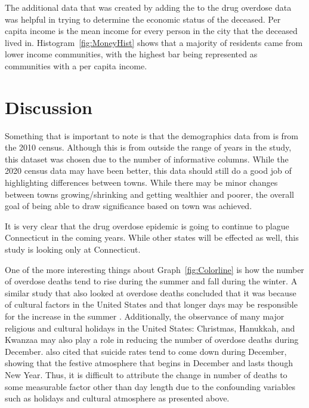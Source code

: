 \documentclass[12pt, letterpaper, titlepage]{article}
\begin{document}
The additional data that was created by adding the \citet{wikiwand_2023} to the drug overdose data was helpful in trying to determine the economic status of the deceased.  Per capita income is the mean income for every person in the city that the deceased lived in.  Histogram~\ref{fig:MoneyHist} shows that a majority of residents came from lower income communities, with the highest bar being represented as communities with a per capita income.  

\section{Discussion}\label{sec:Discussion}
Something that is important to note is that the demographics data from \citet{wikiwand2023} is from the 2010 census.  Although this is from outside the range of years in the study, this dataset was chosen due to the number of informative columns.  While the 2020 census data may have been better, this data should still do a good job of highlighting differences between towns.  While there may be minor changes between towns growing/shrinking and getting wealthier and poorer, the overall goal of being able to draw significance based on town was achieved.

It is very clear that the drug overdose epidemic is going to continue to plague Connecticut in the coming years.  While other states will be effected as well, this study is looking only at Connecticut.

One of the more interesting things about Graph~\ref{fig:Colorline} is how the number of overdose deaths tend to rise during the summer and fall during the winter.  A similar study that also looked at overdose deaths concluded that it was because of cultural factors in the United States and that longer days may be responsible for the increase in the summer \citep{han2022intentional}.  Additionally, the observance of many major religious and cultural holidays in the United States: Christmas, Hanukkah, and Kwanzaa may also play a role in reducing the number of overdose deaths during December.  \citet*{han2022intentional} also cited that suicide rates tend to come down during December, showing that the festive atmosphere that begins in December and lasts though New Year.  Thus, it is difficult to attribute the change in number of deaths to some measurable factor other than day length due to the confounding variables such as holidays and cultural atmosphere as presented above.
\end{document}
